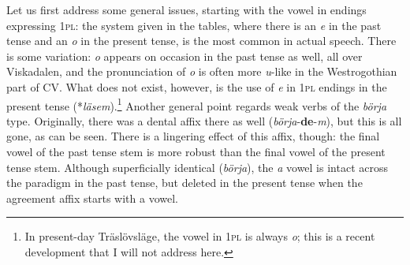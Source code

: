 \documentclass[output=paper,colorlinks,citecolor=brown,draft,draftmode]{langscibook}
\begin{document}
\begin{table}
\footnotesize
\caption{\label{tab:petzell:2b}Viskadalian past tense inflection}
\end{table}

Let us first address some general issues, starting with the vowel in endings expressing 1\textsc{pl}: the system given in the tables, where there is an \textit{e} in the past tense and an \textit{o} in the present tense, is the most common in actual speech. There is some variation: \textit{o} appears on occasion in the past tense as well, all over Viskadalen, and the pronunciation of \textit{o} is often more \textit{u}-like in the Westrogothian part of CV. What does not exist, however, is the use of \textit{e} in 1\textsc{pl} endings in the present tense (*\textit{läsem}).\footnote{In present-day Träslövsläge, the vowel in 1\textsc{pl} is always \textit{o}; this is a recent development that I will not address here.} Another general point regards weak verbs of the \textit{börja} type. Originally, there was a dental affix there as well (\textit{börja}-\textbf{{de}}-\textit{m}), but this is all gone, as can be seen. There is a lingering effect of this affix, though: the final vowel of the past tense stem is more robust than the final vowel of the present tense stem. Although superficially identical (\textit{börja}), the \textit{a} vowel is intact across the paradigm in the past tense, but deleted in the present tense when the agreement affix starts with a vowel.
\end{document}
